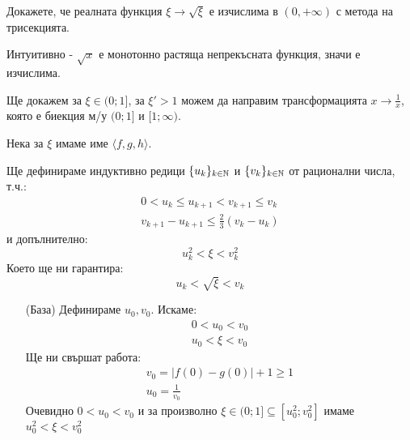 \begin{problem}
Докажете, че реалната функция $\xi \to \sqrt{\xi}$ е изчислима в $(0, +\infty)$ с метода на трисекцията.
\end{problem}
\begin{solution}
    Интуитивно - $\sqrt{x}$ е монотонно растяща непрекъсната функция, значи е изчислима.

    Ще докажем за $\xi \in (0; 1]$, за $\xi' > 1$ можем да направим трансформацията $x \to \frac{1}{x}$, която е биекция м/у $(0;1]$ и $[1; \infty)$.

    Нека за $\xi$ имаме име $\langle f, g, h \rangle$.

    Ще дефинираме индуктивно редици $\{u_k\}_{k \in {\mathbb{N}}}$ и $\{v_k\}_{k \in {\mathbb{N}}}$ от рационални числа, т.ч.:
    \begin{equation}
        \begin{split}
            0 < u_k \leq u_{k+1} < v_{k+1} \leq v_k \\
            v_{k+1} - u_{k+1} \leq \frac{2}{3}(v_k - u_k)
        \end{split}
    \end{equation}
    и допълнително:
    \begin{equation}
        u_k^2 < \xi < v_k^2
    \end{equation}
    Което ще ни гарантира:
    \begin{equation}
        u_k < \sqrt{\xi} < v_k
    \end{equation}
    \begin{itemize}
        \item[(База)] Дефинираме $u_0, v_0$. Искаме:
              \begin{equation}
                  \begin{split}
                      0 < u_0 < v_0 \\
                      u_0 < \xi < v_0
                  \end{split}
              \end{equation}
              Ще ни свършат работа:
              \begin{equation}
                  \begin{split}
                      v_0 = |f(0) - g(0)| + 1 \geq 1 \\
                      u_0 = \frac{1}{v_0}
                  \end{split}
              \end{equation}
              Очевидно $0 < u_0 < v_0$ и за произволно $\xi \in (0; 1] \subseteq [u_0^2;v_0^2]$ имаме $u_0^2 < \xi < v_0^2$

\end{itemize}
\end{solution}
